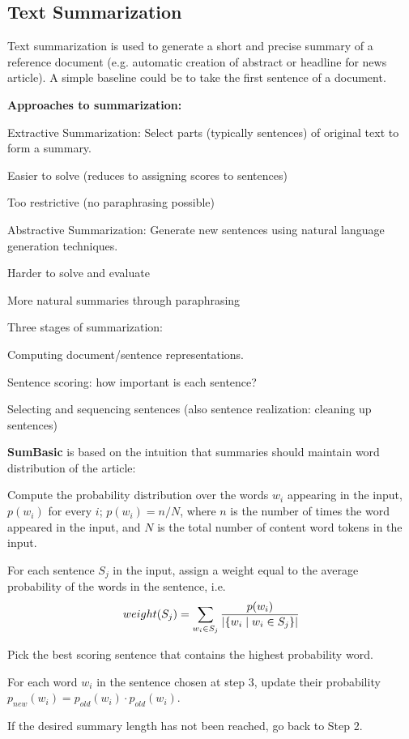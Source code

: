 \documentclass[12pt]{article}
\begin{document}
\subsection{Text Summarization}
Text summarization is used to generate a short and precise summary of a reference document (e.g. automatic creation of abstract or headline for news article). A simple baseline could be to take the first sentence of a document.
\par \textbf{Approaches to summarization:}
\ulb
\item Extractive Summarization: Select parts (typically sentences) of original text to form a summary.
\ulb
\item Easier to solve (reduces to assigning scores to sentences)
\item Too restrictive (no paraphrasing possible)
\ule
\item Abstractive Summarization: Generate new sentences using natural language generation techniques.
\ulb
\item Harder to solve and evaluate
\item More natural summaries through paraphrasing
\ule
\ule
\par Three stages of summarization:
\ulb
\item Computing document/sentence representations.
\item Sentence scoring: how important is each sentence?
\item Selecting and sequencing sentences (also sentence realization: cleaning up sentences)
\ule
\par \textbf{SumBasic} is based on the intuition that summaries should maintain word distribution of the article:
\olb
\item Compute the probability distribution over the words $w_i$ appearing in the input, $p(w_i)$ for every $i$; $ p(w_i) = n/N$, where $n$ is the number of times the word appeared in the input, and $N$ is the total number of content word tokens in the input.
\item For each sentence $S_j$ in the input, assign a weight equal to the average probability of the words in the sentence, i.e.
\[ weight(S_j) = \sum_{w_i\in S_j} \frac{p(w_i)}{|\{ w_i\mid w_i \in S_j \}|} \]
\item Pick the best scoring sentence that contains the highest probability word.
\item For each word $w_i$ in the sentence chosen at step 3, update their probability $p_{new}(w_i) = p_{old}(w_i) \cdot p_{old}(w_i)$.
\item If the desired summary length has not been reached, go back to Step 2.
\end{document}
